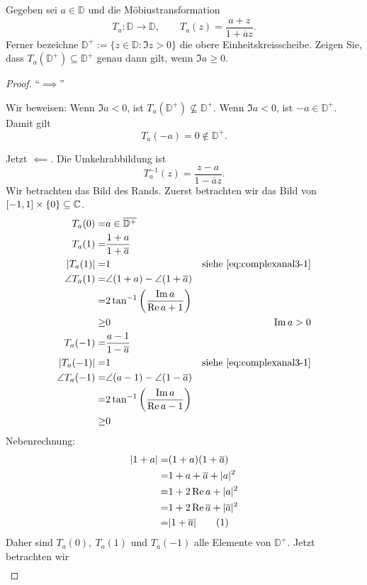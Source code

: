 \begin{Problem}
	Gegeben sei $a\in \mathbb{D}$ und die Möbiustransformation
	\[
	T_a:\mathbb{D}\to\mathbb{D},\qquad T_a(z)=\frac{a+z}{1+\overline{a}z}
	.\] 
	Ferner bezeichne $\mathbb{D}^+:=\{z\in \mathbb{D}:\Im z>0\} $ die obere Einheitskreisscheibe. Zeigen Sie, dass $T_a(\mathbb{D}^+)\subseteq \mathbb{D}^+$ genau dann gilt, wenn $\Im a\ge 0$.
\end{Problem}

\begin{proof}
	``$\implies$''

	Wir beweisen: Wenn $\Im a<0$, ist $T_a(\mathbb{D}^+)\not\subseteq \mathbb{D}^+$. Wenn $\Im a<0$, ist $-a\in \mathbb{D}^+$. Damit gilt
	\[
	T_a(-a)=0\not\in \mathbb{D}^+
	.\] 
	
	Jetzt $\impliedby$. Die Umkehrabbildung ist
\[
T_a^{-1}(z)=\frac{z-a}{1-\overline{a}z}
.\] 
	Wir betrachten das Bild des Rands. Zuerst betrachten wir das Bild von $[-1,1]\times \{0\} \subseteq \mathbb{C}$.
\begin{align*}
	T_a(0)=& a\in \overline{\mathbb{D}^+}\\
	T_a(1)=&\frac{1+a}{1+\overline{a}}\\
	|T_a(1)|=& 1 & \text{siehe \eqref{eq:complexanal3-1}}\\
	\angle T_a(1)=&\angle (1+a) - \angle (1+\overline{a})\\
	=&2\tan^{-1}\left( \frac{\Im a}{\Re a+1} \right)\\
	\ge& 0 & \Im a > 0\\
	T_a(-1)=&\frac{a-1}{1-\overline{a}}\\
	|T_a(-1)|=&1 & \text{siehe \eqref{eq:complexanal3-1}}\\
	\angle T_a(-1)=& \angle (a-1) - \angle (1-\overline{a})\\
	=& 2\tan^{-1}\left( \frac{\Im a}{\Re a - 1} \right)\\
	\ge& 0
\end{align*}
Nebenrechnung: 
\begin{align*}
	|1+a|=&(1+a)(1+\overline{a})\\
	=&1+a+\overline{a}+|a|^2\\
	=&1+2\Re a+|a|^2\\
	=&1 + 2\Re \overline{a}+|\overline{a}|^2\\
	=&|1+\overline{a}|\addtocounter{equation}{1}\tag{\theequation}\label{eq:complexanal3-1} 
\end{align*}
Daher sind $T_a(0),~T_a(1)$ und $T_a(-1)$ alle Elemente von $\mathbb{D}^+$. Jetzt betrachten wir
\begin{align*}

\end{align*}
\end{proof}
